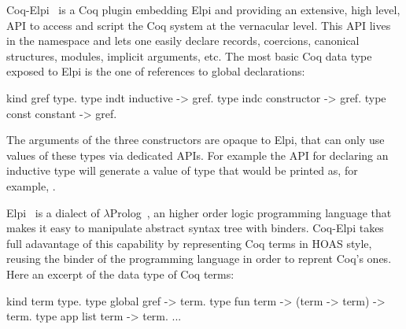 \documentclass[a4paper,UKenglish,cleveref, autoref]{lipics-v2019}
\theoremstyle{implem}
\theoremstyle{implem}
\theoremstyle{axiom}
\theoremstyle{abscommand}
\theoremstyle{command}
\begin{document}
Coq-Elpi~\cite{CoqElpi} is a Coq plugin embedding
Elpi and providing an
extensive, high level, API to access and script the Coq system at the
vernacular level.
This API lives in the  namespace and lets one easily declare
records, coercions, canonical structures, modules, implicit arguments, etc.
The most basic Coq data type exposed to Elpi is the one of references to global
declarations:

\begin{elpicode}
kind gref  type.
type indt  inductive -> gref.    %
type indc  constructor -> gref.  %
type const constant -> gref.     %
\end{elpicode}

The arguments of the three constructors are opaque to Elpi, that can only use
values of these types via dedicated APIs. For example the API for declaring
an inductive type will generate a value of type  that
would be printed as, for example, .

Elpi~\cite{DBLP:conf/lpar/DunchevGCT15} is a dialect
of $\lambda$Prolog~\cite{Miller:2012:PHL:2331097}, an higher order
logic programming language that makes it easy to manipulate abstract syntax
tree with binders. Coq-Elpi takes full adavantage of this capability by
representing Coq terms in HOAS style, reusing the binder of the programming
language in order to reprent Coq's ones. Here an excerpt of the data
type of Coq terms:

\begin{elpicode}
kind term type.
type global gref -> term.                    %
type fun    term -> (term -> term) -> term.  %
type app    list term -> term.               %
... %
\end{elpicode}
\end{document}
